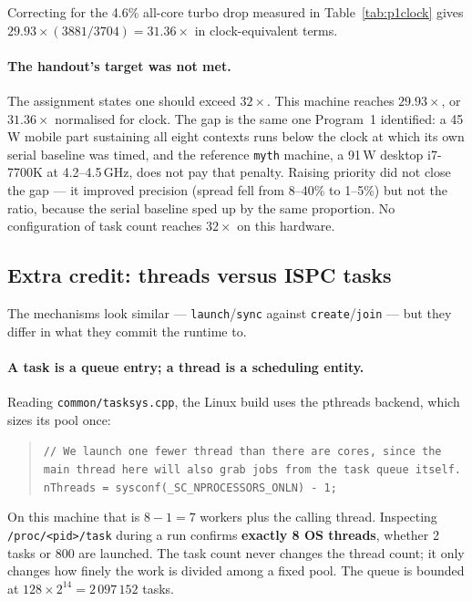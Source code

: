 \documentclass[11pt,a4paper]{article}
\begin{document}
Correcting for the 4.6\% all-core turbo drop measured in
Table~\ref{tab:p1clock} gives $29.93 \times (3881/3704) = 31.36\times$ in
clock-equivalent terms.

\paragraph{The handout's target was not met.} The assignment states one should
exceed $32\times$. This machine reaches $29.93\times$, or $31.36\times$
normalised for clock. The gap is the same one Program~1 identified: a 45\,W
mobile part sustaining all eight contexts runs below the clock at which its own
serial baseline was timed, and the reference \texttt{myth} machine, a 91\,W
desktop i7-7700K at 4.2--4.5\,GHz, does not pay that penalty. Raising priority
did not close the gap --- it improved precision (spread fell from 8--40\% to
1--5\%) but not the ratio, because the serial baseline sped up by the same
proportion. No configuration of task count reaches $32\times$ on this hardware.

\subsection{Extra credit: threads versus ISPC tasks}

The mechanisms look similar --- \texttt{launch}/\texttt{sync} against
\texttt{create}/\texttt{join} --- but they differ in what they commit the
runtime to.

\paragraph{A task is a queue entry; a thread is a scheduling entity.} Reading
\texttt{common/tasksys.cpp}, the Linux build uses the pthreads backend, which
sizes its pool once:

\begin{quote}\small
\texttt{// We launch one fewer thread than there are cores, since the main
thread here will also grab jobs from the task queue itself.} \\
\texttt{nThreads = sysconf(\_SC\_NPROCESSORS\_ONLN) - 1;}
\end{quote}

On this machine that is $8 - 1 = 7$ workers plus the calling thread. Inspecting
\texttt{/proc/<pid>/task} during a run confirms \textbf{exactly 8 OS threads},
whether 2 tasks or 800 are launched. The task count never changes the thread
count; it only changes how finely the work is divided among a fixed pool. The
queue is bounded at $128 \times 2^{14} = 2\,097\,152$ tasks.
\end{document}
